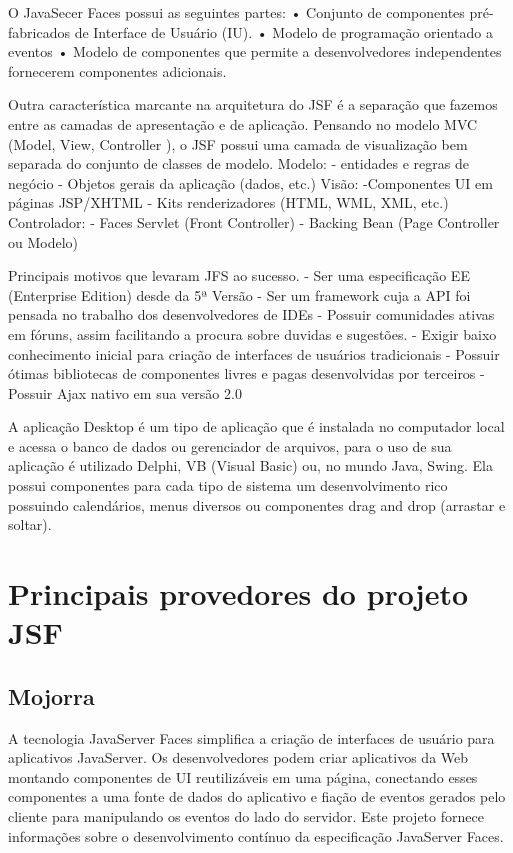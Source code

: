 \documentclass[12pt,a4paper]{article}
\begin{document}
O JavaSecer Faces possui as seguintes partes:
•	Conjunto de componentes pré-fabricados de Interface de Usuário (IU).
•	Modelo de programação orientado a eventos
•	Modelo de componentes que permite a desenvolvedores independentes fornecerem componentes adicionais.

	Outra característica marcante na arquitetura do JSF é a separação que fazemos entre as camadas de apresentação e de aplicação. Pensando no modelo MVC (Model, View, Controller ), o JSF possui uma camada de visualização bem separada do conjunto de classes de modelo.
  Modelo:
- entidades e regras de negócio
- Objetos gerais da aplicação (dados, etc.)
Visão:
-Componentes UI em páginas JSP/XHTML
- Kits renderizadores (HTML, WML, XML, etc.)
Controlador:
- Faces Servlet (Front Controller)
- Backing Bean (Page Controller ou Modelo)

Principais motivos que levaram JFS ao sucesso.
-	Ser uma especificação EE (Enterprise Edition)  desde da 5ª Versão
-	Ser um framework cuja a API foi pensada no trabalho dos desenvolvedores de IDEs
-	Possuir comunidades ativas em fóruns, assim facilitando a procura sobre duvidas e sugestões.
-	Exigir baixo conhecimento inicial para criação de interfaces de usuários tradicionais
-	Possuir ótimas bibliotecas de componentes livres e pagas desenvolvidas por terceiros
-	Possuir Ajax nativo em sua versão 2.0

 A aplicação Desktop é um tipo de aplicação que é instalada no computador local e acessa o banco de dados ou gerenciador de arquivos, para o uso de sua aplicação é utilizado Delphi, VB (Visual Basic) ou, no mundo Java, Swing. Ela possui componentes para cada tipo de sistema um desenvolvimento rico possuindo calendários, menus diversos ou componentes drag and drop (arrastar e soltar).

\section{Principais provedores do projeto JSF}
\subsection{Mojorra}
A tecnologia JavaServer Faces simplifica a criação de interfaces de usuário para aplicativos JavaServer. Os desenvolvedores podem criar aplicativos da Web montando componentes de UI reutilizáveis em uma página, conectando esses componentes a uma fonte de dados do aplicativo e fiação de eventos gerados pelo cliente para manipulando os eventos do lado do servidor. Este projeto fornece informações sobre o desenvolvimento contínuo da especificação JavaServer Faces.
\end{document}
